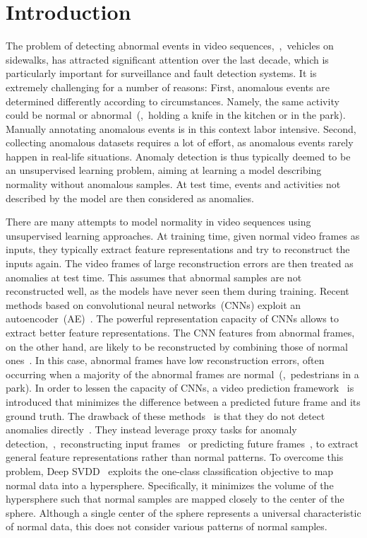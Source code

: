 \documentclass[10pt,twocolumn,letterpaper]{article}
\begin{document}
\vspace{-0.2cm}
\section{Introduction}
\vspace{-0.1cm}
The problem of detecting abnormal events in video sequences,~\eg,~vehicles on sidewalks, has attracted significant attention over the last decade, which is particularly important for surveillance and fault detection systems. It is extremely challenging for a number of reasons: First, anomalous events are determined differently according to circumstances. Namely, the same activity could be normal or abnormal~(\eg,~holding a knife in the kitchen or in the park). Manually annotating anomalous events is in this context labor intensive. Second, collecting anomalous datasets requires a lot of effort, as anomalous events rarely happen in real-life situations. Anomaly detection is thus typically deemed to be an unsupervised learning problem, aiming at learning a model describing normality without anomalous samples. At test time, events and activities not described by the model are then considered as anomalies. 

There are many attempts to model normality in video sequences using unsupervised learning approaches. At training time, given normal video frames as inputs, they typically extract feature representations and try to reconstruct the inputs again. The video frames of large reconstruction errors are then treated as anomalies at test time. This assumes that abnormal samples are not reconstructed well, as the models have never seen them during training. Recent methods based on convolutional neural networks~(CNNs) exploit an autoencoder~(AE)~\cite{bengio2007greedy,kingma2013auto}. The powerful representation capacity of CNNs allows to extract better feature representations. The CNN features from abnormal frames, on the other hand, are likely to be reconstructed by combining those of normal ones~\cite{liu2018future,gong2019memorizing}. In this case, abnormal frames have low reconstruction errors, often occurring when a majority of the abnormal frames are normal~(\eg,~pedestrians in a park). In order to lessen the capacity of CNNs, a video prediction framework~\cite{liu2018future} is introduced that minimizes the difference between a predicted future frame and its ground truth. The drawback of these methods~\cite{bengio2007greedy,kingma2013auto,liu2018future} is that they do not detect anomalies directly~\cite{ruff2018deep}. They instead leverage proxy tasks for anomaly detection,~\eg,~reconstructing input frames~\cite{bengio2007greedy,kingma2013auto} or predicting future frames~\cite{liu2018future}, to extract general feature representations rather than normal patterns. To overcome this problem, Deep SVDD~\cite{ruff2018deep} exploits the one-class classification objective to map normal data into a hypersphere. Specifically, it minimizes the volume of the hypersphere such that normal samples are mapped closely to the center of the sphere. Although a single center of the sphere represents a universal characteristic of normal data, this does not consider various patterns of normal samples. 
\end{document}
